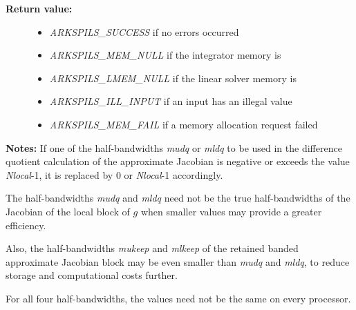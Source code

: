 \documentclass[letterpaper,10pt,english]{sphinxmanual}
\begin{document}
\begin{fulllineitems}
\begin{description}
\begin{itemize}
\end{itemize}

\item[{\textbf{Return value:}}] \leavevmode\begin{itemize}
\item {} 
\emph{ARKSPILS\_SUCCESS} if no errors occurred

\item {} 
\emph{ARKSPILS\_MEM\_NULL} if the integrator memory is 

\item {} 
\emph{ARKSPILS\_LMEM\_NULL} if the linear solver memory is 

\item {} 
\emph{ARKSPILS\_ILL\_INPUT} if an input has an illegal value

\item {} 
\emph{ARKSPILS\_MEM\_FAIL} if a memory allocation request failed

\end{itemize}

\end{description}

\textbf{Notes:}  If one of the half-bandwidths \emph{mudq} or \emph{mldq} to be used
in the difference quotient calculation of the approximate Jacobian is
negative or exceeds the value \emph{Nlocal}-1, it is replaced by 0 or
\emph{Nlocal}-1 accordingly.

The half-bandwidths \emph{mudq} and \emph{mldq} need not be the true
half-bandwidths of the Jacobian of the local block of \(g\)
when smaller values may provide a greater efficiency.

Also, the half-bandwidths \emph{mukeep} and \emph{mlkeep} of the retained
banded approximate Jacobian block may be even smaller than
\emph{mudq} and \emph{mldq}, to reduce storage and computational costs
further.

For all four half-bandwidths, the values need not be the same on
every processor.

\end{fulllineitems}
\end{document}
